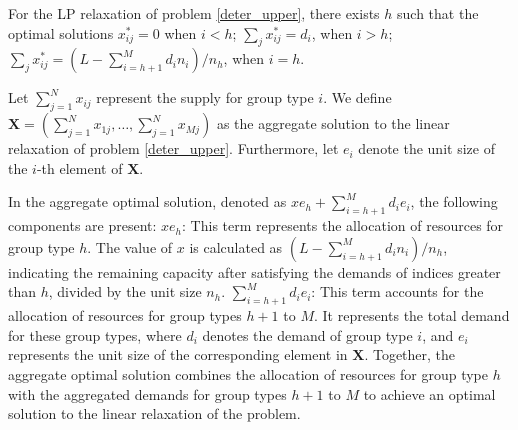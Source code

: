 \begin{lem}\label{sol_relax_deter}
For the LP relaxation of problem \eqref{deter_upper}, there exists $h$ such that the optimal solutions $x_{ij}^{*} = 0$ when $i < h$; $\sum_{j} x_{ij}^{*} = d_{i}$, when $i > h$; $\sum_{j} x_{ij}^{*} = (L - \sum_{i = h+1}^{M} {d_i n_i})/ n_h$, when $i = h$.
\end{lem}

Let $\sum_{j=1}^{N} x_{ij}$ represent the supply for group type $i$. We define $\mathbf{X} = (\sum_{j=1}^{N} x_{1j},\ldots, \sum_{j=1}^{N} x_{Mj})$ as the aggregate solution to the linear relaxation of problem \eqref{deter_upper}. Furthermore, let $e_{i}$ denote the unit size of the $i$-th element of $\mathbf{X}$.

In the aggregate optimal solution, denoted as $x e_{h} + \sum_{i=h+1} ^{M} d_{i} e_{i}$, the following components are present: $x e_{h}$: This term represents the allocation of resources for group type $h$. The value of $x$ is calculated as $(L- \sum_{i = h+1}^{M} {d_i n_i})/ n_h$, indicating the remaining capacity after satisfying the demands of indices greater than $h$, divided by the unit size $n_h$. $\sum_{i=h+1} ^{M} d_{i} e_{i}$: This term accounts for the allocation of resources for group types $h+1$ to $M$. It represents the total demand for these group types, where $d_i$ denotes the demand of group type $i$, and $e_{i}$ represents the unit size of the corresponding element in $\mathbf{X}$. Together, the aggregate optimal solution combines the allocation of resources for group type $h$ with the aggregated demands for group types $h+1$ to $M$ to achieve an optimal solution to the linear relaxation of the problem.





